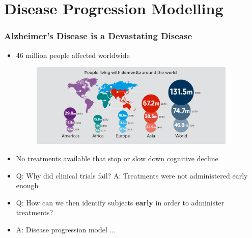 
% 
% 
% 
% 

\section{Disease Progression Modelling}

\begin{frame}
\frametitle{Alzheimer's Disease is a Devastating Disease}

\vspace{-1em}
\begin{itemize}
 \item 46 million people affected worldwide
 
  \begin{figure}
 \centering
  \includegraphics[height=4cm]{adPrevalanceIncreasing}
 \end{figure}
 
  \item No treatments available that stop or slow down cognitive decline
  \item Q: Why did clinical trials fail? A: Treatments were not administered early enough 
 \vspace{1em}
  \item Q: How can we then identify subjects \textbf{early} in order to administer treatments? 
  \item A: Disease progression model ...
 

\end{itemize}

\vspace{-1em}

\end{frame}

\newcommand{\sz}{1}

